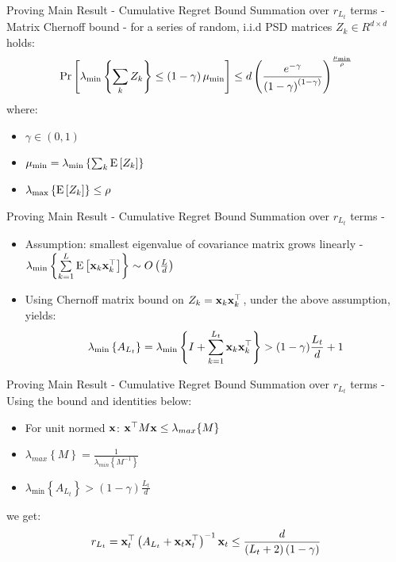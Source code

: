 \documentclass{beamer}
\begin{document}
\begin{frame}{Proving Main Result - Cumulative Regret Bound}
Summation over $r_{L_t}$ terms - \newline\newline
Matrix Chernoff bound - for a series of random, i.i.d PSD matrices $Z_k\in R^{d\times d}$ holds:
\begin{equation*}
{\rm Pr}\left[{\lambda_{\min}\left\{\sum_k Z_k \right\}\leq \left(1-\gamma\right)\mu_{\min}}\right]\leq d\left(\frac{e^{-\gamma}}{ \left(1-\gamma\right)^{ \left(1-\gamma\right)}}\right)^{\frac{\mu_{\min}}{\rho}}
\end{equation*}
where:
\begin{itemize}
\item $\gamma\in (0,1)$
\item $\mu_{\min}=\lambda_{\min}\left\{\sum_k{\rm E}\left[{Z_k}\right]\right\}$
\item $\lambda_{\max}\left\{{\rm E}\left[{Z_k}\right]\right\}\leq\rho$
\end{itemize}

\end{frame}


\begin{frame}{Proving Main Result - Cumulative Regret Bound}
Summation over $r_{L_t}$ terms - \newline
\begin{itemize}
\item Assumption: smallest eigenvalue of covariance matrix grows linearly - $\lambda_{\min}\left\{\sum\limits_{k=1}^{L}{\rm E}\left[{\mathbf{x}_{k}{\mathbf{x}}^{\top}_{k}}\right]\right\}\sim O\left(\frac{L}{d}\right)$\newline 
\item Using Chernoff matrix bound on $Z_k=\mathbf{x}_{k}{\mathbf{x}}^{\top}_{k}$, under the above assumption, yields:
\begin{equation*}
\lambda_{\min}\left\{A_{L_t}\right\}=\lambda_{\min}\left\{I+\sum\limits_{k=1}^{L_t} \mathbf{x}_{k}{\mathbf{x}}^{\top}_{k}\right\}>(1-\gamma)\frac{L_t}{d}+1
\label{lamda_min_bound}
\end{equation*}
\end{itemize}
\end{frame}


\begin{frame}{Proving Main Result - Cumulative Regret Bound}
Summation over $r_{L_t}$ terms - \newline\newline
Using the bound and identities below:\newline
\begin{itemize}
\item For unit normed $\mathbf{x}$: ${\mathbf{x}}^{\top} M\mathbf{x}\leq \lambda_{max}\{M\}$
\item $\lambda_{max}\left\{M\right\}=\frac{1}{\lambda_{min}\left\{M^{-1}\right\}}$
\item $\lambda_{\min}\left\{A_{L_t}\right\}>\left(1-\gamma\right)\frac{L_t}{d}$\newline
\end{itemize}
we get:
\begin{eqnarray*}
r_{L_t}={\mathbf{x}}^{\top}_{t}\left(A_{L_t}+\mathbf{x}_{t}{\mathbf{x}}^{\top}_{t}\right)^{-1}\mathbf{x}_{t}\leq\frac{d}{\left(L_t+2\right)\left(1-\gamma\right)}
\end{eqnarray*}
\end{frame}
\end{document}

